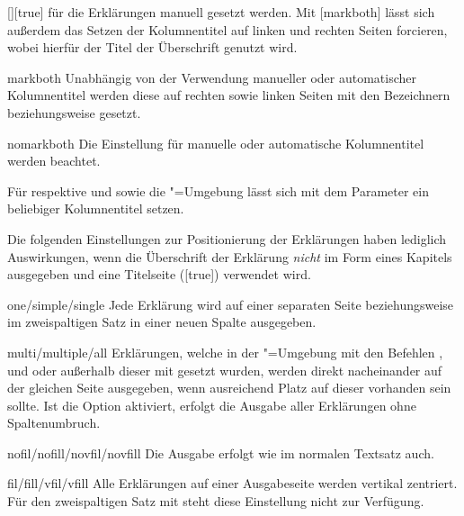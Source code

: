 \begin{Declaration}{[\PSet]}[true]
für die Erklärungen manuell gesetzt werden. Mit [markboth] 
lässt sich außerdem das Setzen der Kolumnentitel auf linken und rechten Seiten 
forcieren, wobei hierfür der Titel der Überschrift genutzt wird.
%
\begin{values}
\item[markboth]
  Unabhängig von der Verwendung manueller oder automatischer Kolumnentitel 
  werden diese auf rechten sowie linken Seiten mit den Bezeichnern 
   beziehungsweise  gesetzt.
\item[nomarkboth]
  Die Einstellung für manuelle oder automatische Kolumnentitel werden beachtet.
\end{values}
%
Für  respektive  und  
sowie die "=Umgebung lässt sich mit dem Parameter 
 ein beliebiger Kolumnentitel setzen. 

Die folgenden Einstellungen zur Positionierung der Erklärungen haben lediglich 
Auswirkungen, wenn die Überschrift der Erklärung \emph{nicht} im Form eines 
Kapitels ausgegeben und eine Titelseite ([true]) verwendet 
wird.
%
\begin{values}
\item[one/simple/single]
  Jede Erklärung wird auf einer separaten Seite
  beziehungsweise im zweispaltigen Satz in einer neuen Spalte ausgegeben.
\item[multi/multiple/all]
  Erklärungen, welche in der "=Umgebung mit den 
  Befehlen ,  und  oder 
  außerhalb dieser mit  gesetzt wurden, werden direkt 
  nacheinander auf der gleichen Seite ausgegeben, wenn ausreichend Platz auf 
  dieser vorhanden sein sollte. Ist die Option  aktiviert, 
  erfolgt die Ausgabe aller Erklärungen ohne Spaltenumbruch.
\item[nofil/nofill/novfil/novfill]
  Die Ausgabe erfolgt wie im normalen Textsatz auch.
\item[fil/fill/vfil/vfill]
  Alle Erklärungen auf einer Ausgabeseite werden vertikal zentriert. Für 
  den zweispaltigen Satz mit  steht diese Einstellung nicht 
  zur Verfügung.
\end{values}
\end{Declaration}

